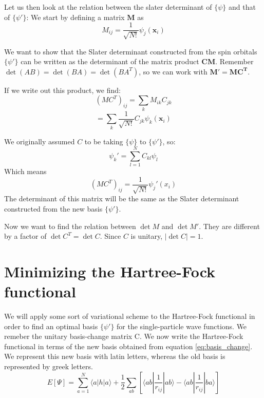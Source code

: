 \documentclass[a4paper,10pt, twocolumn, pre]{revtex4}
\newcommand{\xvec}{\mathbf{x}}
\newcommand{\mb}{\mathbf}
\begin{document}
Let us then look at the relation between the slater determinant of $\{ \psi\}$ and that of $\{\psi'\}$:
We start by defining a matrix $\mb{M}$ as
\begin{equation}
	M_{ij} =\frac{1}{\sqrt{N!}} \psi_j(\xvec_i)
\end{equation}

We want to show that the Slater determinant constructed from the spin orbitals $\{\psi'\}$ can be written as the determinant of the matrix product $\mb{C}\mb{M}$. Remember $\det(AB) = \det(BA) = \det(BA^T)$, so we can work with $\mb{M}'=\mb{M}\mb{C^T}$.

If we write out this product, we find:
\begin{equation}
	(MC^T)_{ij} = \sum_{k} M_{ik} C_{jk}
\end{equation}
\begin{equation}
	= \sum_{k}\frac{1}{\sqrt{N!}}C_{jk}\psi_k(\xvec_i)
\end{equation}

We originally assumed $C$ to be taking $\{ \psi\}$ to $\{\psi'\}$, so:
\begin{equation}
	\psi_k' = \sum_{l=1}^N C_{kl} \psi_l
	\label{eq:basis_change}
\end{equation}
Which means
\begin{equation}
(MC^T)_{ij} = \frac{1}{\sqrt{N!}} \psi_j'(x_i)
\end{equation}
The determinant of this matrix will be the same as the Slater determinant constructed from the new basis $\{\psi'\}$.

Now we want to find the relation between $\det{M}$ and $\det{M'}$. They are different by a factor of $\det{C^T} = \det{C}$. Since $C$ is unitary, $|\det C| = 1$.

\section{Minimizing the Hartree-Fock functional}
We will apply some sort of variational scheme to the Hartree-Fock functional in order to find an optimal basis $\{\psi'\}$ for the single-particle wave functions. We remeber the unitary basis-change matrix C. 
We now write the Hartree-Fock functional in terms of the new basis obtained from equation \ref{eq:basis_change}. We represent this new basis with latin letters, whereas the old basis is represented by greek letters. 
\begin{equation}
	E[\Psi] = \sum_{a=1}^N \langle a|h|a \rangle + \frac{1}{2} \sum_{ab}\left[  \langle ab |\frac{1}{r_{ij}}|ab \rangle - \langle ab | \frac{1}{r_{ij} }| ba\rangle \right]
\end{equation}
\end{document}

